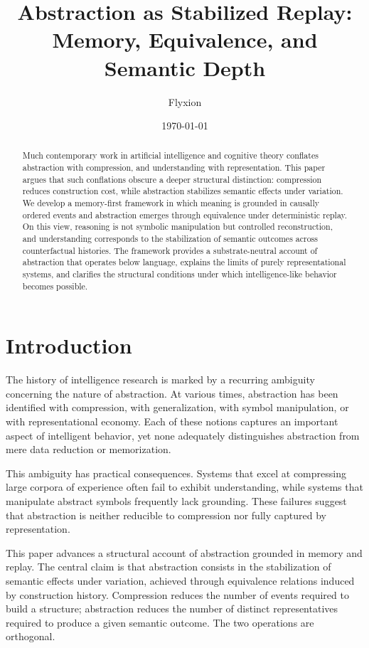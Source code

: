 \documentclass[11pt]{article}
\title{Abstraction as Stabilized Replay:\\
Memory, Equivalence, and Semantic Depth}
\author{Flyxion}
\date{\today}
\begin{document}
\maketitle

\begin{abstract}
Much contemporary work in artificial intelligence and cognitive theory conflates abstraction with compression, and understanding with representation. This paper argues that such conflations obscure a deeper structural distinction: compression reduces construction cost, while abstraction stabilizes semantic effects under variation. We develop a memory-first framework in which meaning is grounded in causally ordered events and abstraction emerges through equivalence under deterministic replay. On this view, reasoning is not symbolic manipulation but controlled reconstruction, and understanding corresponds to the stabilization of semantic outcomes across counterfactual histories. The framework provides a substrate-neutral account of abstraction that operates below language, explains the limits of purely representational systems, and clarifies the structural conditions under which intelligence-like behavior becomes possible.
\end{abstract}

\section{Introduction}

The history of intelligence research is marked by a recurring ambiguity concerning the nature of abstraction. At various times, abstraction has been identified with compression, with generalization, with symbol manipulation, or with representational economy. Each of these notions captures an important aspect of intelligent behavior, yet none adequately distinguishes abstraction from mere data reduction or memorization.

This ambiguity has practical consequences. Systems that excel at compressing large corpora of experience often fail to exhibit understanding, while systems that manipulate abstract symbols frequently lack grounding. These failures suggest that abstraction is neither reducible to compression nor fully captured by representation.

This paper advances a structural account of abstraction grounded in memory and replay. The central claim is that abstraction consists in the stabilization of semantic effects under variation, achieved through equivalence relations induced by construction history. Compression reduces the number of events required to build a structure; abstraction reduces the number of distinct representatives required to produce a given semantic outcome. The two operations are orthogonal.
\end{document}
